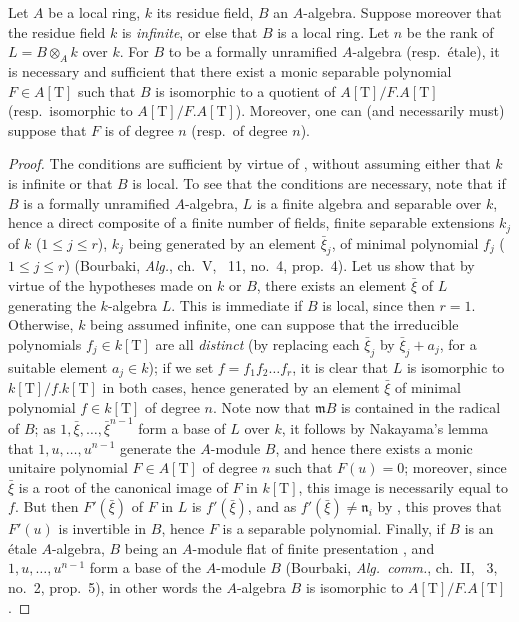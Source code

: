 \begin{proposition}[18.4.5]
\label{IV.18.4.5}
Let $A$ be a local ring, $k$ its residue field, $B$ an $A$-algebra.
Suppose moreover that the residue field $k$ is \emph{infinite}, or else that $B$ is a local ring.
Let $n$ be the rank of $L=B\otimes_A k$ over $k$.
For $B$ to be a formally unramified $A$-algebra (resp.\ \'etale), it is necessary and sufficient that there exist a monic separable polynomial $F\in A[\mathrm{T}]$ such that $B$ is isomorphic to a quotient of $A[\mathrm{T}]/F.A[\mathrm{T}]$ (resp.\ isomorphic to $A[\mathrm{T}]/F.A[\mathrm{T}]$).
Moreover, one can (and necessarily must) suppose that $F$ is of degree $n$ (resp.\ of degree $n$).
\end{proposition}

\begin{proof}
The conditions are sufficient by virtue of , without assuming either that $k$ is infinite or that $B$ is local.
To see that the conditions are necessary, note that if $B$ is a formally unramified $A$-algebra, $L$ is a finite algebra and separable over $k$, hence a direct composite of a finite number of fields, finite separable extensions $k_j$ of $k$ ($1\leq j\leq r$), $k_j$ being generated by an element $\bar{\xi}_j$, of minimal polynomial $f_j$ ($1\leq j\leq r$) (Bourbaki, \emph{Alg.}, ch.~V, \textsection~11, no.~4, prop.~4).
Let us show that by virtue of the hypotheses made on $k$ or $B$, there exists an element $\bar{\xi}$ of $L$ generating the $k$-algebra $L$.
This is immediate if $B$ is local, since then $r=1$.
Otherwise, $k$ being assumed infinite, one can suppose that the irreducible polynomials $f_j\in k[\mathrm{T}]$ are all \emph{distinct} (by replacing each $\bar{\xi}_j$ by $\bar{\xi}_j+a_j$, for a suitable element $a_j\in k$);
if we set $f=f_1 f_2\ldots f_r$, it is clear that $L$ is isomorphic to $k[\mathrm{T}]/f.k[\mathrm{T}]$ in both cases, hence generated by an element $\bar{\xi}$ of minimal polynomial $f\in k[\mathrm{T}]$ of degree $n$.
Note now that $\mathfrak{m}B$ is contained in the radical of $B$;
as $1,\bar{\xi},\ldots,\bar{\xi}^{n-1}$ form a base of $L$ over $k$, it follows by Nakayama's lemma that $1,u,\ldots,u^{n-1}$ generate the $A$-module $B$, and hence there exists a monic unitaire polynomial $F\in A[\mathrm{T}]$ of degree $n$ such that $F(u)=0$;
moreover, since $\bar{\xi}$ is a root of the canonical image of $F$ in $k[\mathrm{T}]$, this image is necessarily equal to $f$.
But then $F'(\bar{\xi})$ of $F$ in $L$ is $f'(\bar{\xi})$, and as $f'(\bar{\xi})\neq\mathfrak{n}_i$ by , this proves that $F'(u)$ is invertible in $B$, hence $F$ is a separable polynomial.
Finally, if $B$ is an \'etale $A$-algebra, $B$ being an $A$-module flat of finite presentation , and $1,u,\ldots,u^{n-1}$ form a base of the $A$-module $B$ (Bourbaki, \emph{Alg.\ comm.}, ch.~II, \textsection~3, no.~2, prop.~5), in other words the $A$-algebra $B$ is isomorphic to $A[\mathrm{T}]/F.A[\mathrm{T}]$.
\end{proof}

